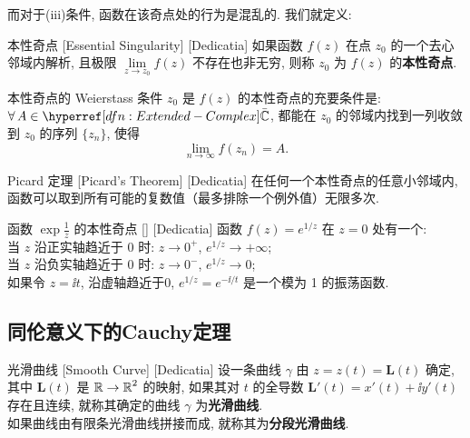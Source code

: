         而对于(iii)条件, 函数在该奇点处的行为是混乱的. 我们就定义: 

        \begin{dfn}
            {本性奇点}
            [Essential Singularity]
            [Dedicatia]
            如果函数 \(f(z)\) 在点 \(z_0\) 的一个去心邻域内解析, 且极限 \(\lim\limits_{z \to z_0} f(z)\) 不存在也非无穷, 则称 \(z_0\) 为 \(f(z)\) 的\textbf{本性奇点}. 
        \end{dfn}

        \begin{thm}
            {本性奇点的 Weierstass 条件}
            \(z_0\) 是 \(f(z)\) 的本性奇点的充要条件是:  \(\forall\,A\in\barC\), 都能在 \(z_0\) 的邻域内找到一列收敛到 \(z_0\) 的序列 \(\{z_n\}\), 使得 
            \[\lim_{n\to\infty}f(z_n)=A.\]
        \end{thm}

        \begin{thm}
            [Picard]
            {Picard 定理}
            [Picard's Theorem]
            [Dedicatia]
            在任何一个本性奇点的任意小邻域内, 函数可以取到所有可能的复数值（最多排除一个例外值）无限多次. 
        \end{thm}

        \begin{xmp}
            {函数 \(\exp\frac{1}{z}\) 的本性奇点}
            []
            [Dedicatia]
            函数 \(f(z) = e^{1/z}\) 在 \(z=0\) 处有一个\EssentialSingularity :\\
            当 \(z\) 沿正实轴趋近于 0 时: \(z \to 0^+\), \(e^{1/z} \to +\infty\);\\ 
            当 \(z\) 沿负实轴趋近于 0 时: \(z \to 0^-\), \(e^{1/z} \to 0\);\\
            如果令 \(z =\ii t\), 沿虚轴趋近于0, \(e^{1/z} = e^{-\ii/t}\) 是一个模为 1 的振荡函数.
        \end{xmp}

    \subsection{同伦意义下的Cauchy定理}

        \begin{dfn}
            {光滑曲线}
            [Smooth Curve]
            [Dedicatia]
            设一条曲线 \(\gamma\) 由 \(z=z(t)=\bm{L}(t)\) 确定, 其中 \(\bm{L}(t)\) 是 \(\operatorname{\mathbb{R}}\to\operatorname{\mathbb{R}}^2\) 的映射, 如果其对 \(t\) 的全导数 \(\bm{L}'(t)=x'(t)+\ii y'(t)\) 存在且连续, 就称其确定的曲线 \(\gamma\) 为\textbf{光滑曲线}. \\
            如果曲线由有限条光滑曲线拼接而成, 就称其为\textbf{分段光滑曲线}. 
        \end{dfn}

